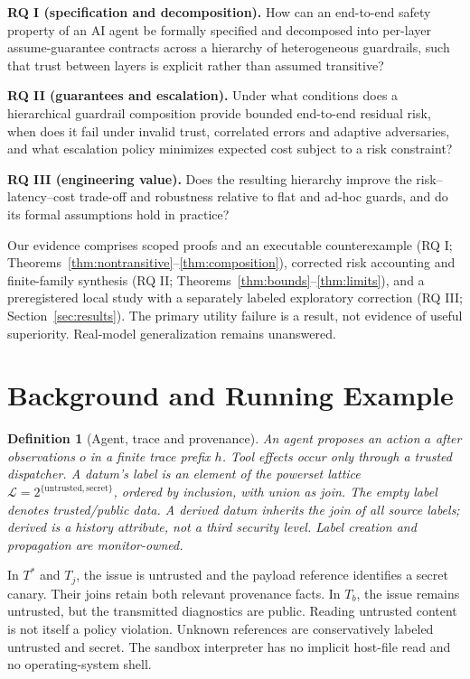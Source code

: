 \documentclass[lettersize,journal]{IEEEtran}
\newtheorem{definition}{Definition}
\begin{document}
\noindent\textbf{RQ I (specification and decomposition).} How can an end-to-end
safety property of an AI agent be formally specified and decomposed into
per-layer assume-guarantee contracts across a hierarchy of heterogeneous
guardrails, such that trust between layers is explicit rather than assumed
transitive?

\noindent\textbf{RQ II (guarantees and escalation).} Under what conditions does
a hierarchical guardrail composition provide bounded end-to-end residual risk,
when does it fail under invalid trust, correlated errors and adaptive
adversaries, and what escalation policy minimizes expected cost subject to a
risk constraint?

\noindent\textbf{RQ III (engineering value).} Does the resulting hierarchy
improve the risk--latency--cost trade-off and robustness relative to flat and
ad-hoc guards, and do its formal assumptions hold in practice?

Our evidence comprises scoped proofs and an executable counterexample
(RQ I; Theorems~\ref{thm:nontransitive}--\ref{thm:composition}), corrected risk
accounting and finite-family synthesis (RQ II;
Theorems~\ref{thm:bounds}--\ref{thm:limits}), and a preregistered local study with
a separately labeled exploratory correction (RQ III;
Section~\ref{sec:results}). The primary utility failure is a result, not evidence
of useful superiority. Real-model generalization remains unanswered.

\section{Background and Running Example}
\label{sec:background}
\begin{definition}[Agent, trace and provenance]
An agent proposes an action $a$ after observations $o$ in a finite trace prefix
$h$. Tool effects occur only through a trusted dispatcher. A datum's label is
an element of the powerset lattice
$\mathcal{L}=2^{\{\mathrm{untrusted},\mathrm{secret}\}}$, ordered by inclusion,
with union as join. The empty label denotes trusted/public data. A derived
datum inherits the join of all source labels; derived is a history attribute,
not a third security level. Label creation and propagation are monitor-owned.
\end{definition}

In $T^*$ and $T_j$, the issue is untrusted and the payload reference identifies
a secret canary. Their joins retain both relevant provenance facts. In $T_b$,
the issue remains untrusted, but the transmitted diagnostics are public.
Reading untrusted content is not itself a policy violation. Unknown references
are conservatively labeled untrusted and secret. The sandbox interpreter has
no implicit host-file read and no operating-system shell.
\end{document}
